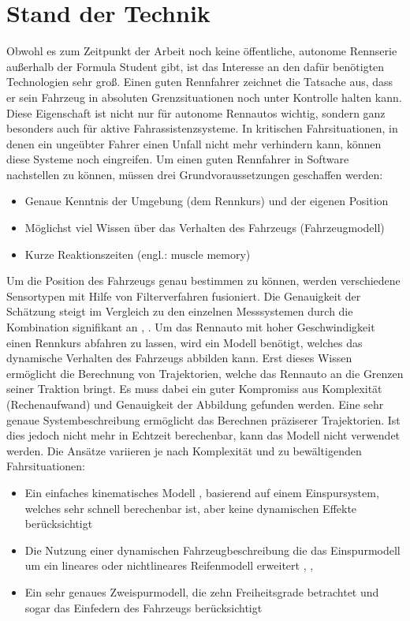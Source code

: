 \documentclass{like}
\begin{document}
\chapter{Stand der Technik}
Obwohl es zum Zeitpunkt der Arbeit noch keine öffentliche, autonome Rennserie außerhalb der Formula Student gibt, ist das Interesse an den dafür benötigten Technologien sehr groß.
Einen guten Rennfahrer zeichnet die Tatsache aus, dass er sein Fahrzeug in absoluten Grenzsituationen noch unter Kontrolle halten kann. Diese Eigenschaft ist nicht nur für autonome Rennautos wichtig, sondern ganz besonders auch für aktive Fahrassistenzsysteme. In kritischen Fahrsituationen, in denen ein ungeübter Fahrer einen Unfall nicht mehr verhindern kann, können diese Systeme noch eingreifen. Um einen guten Rennfahrer in Software nachstellen zu können, müssen drei Grundvoraussetzungen geschaffen werden:
\begin{itemize}
	\item Genaue Kenntnis der Umgebung (dem Rennkurs) und der eigenen Position
	\item Möglichst viel Wissen über das Verhalten des Fahrzeugs (Fahrzeugmodell)
	\item Kurze Reaktionszeiten (engl.: muscle memory)
\end{itemize}

Um die Position des Fahrzeugs genau bestimmen zu können, werden verschiedene Sensortypen mit Hilfe von Filterverfahren fusioniert. Die Genauigkeit der Schätzung steigt im Vergleich zu den einzelnen Messsystemen durch die Kombination signifikant an \cite{GPS_Fusion}, \cite{GPS_IMU_Fusion}.  
\newline
Um das Rennauto mit hoher Geschwindigkeit einen Rennkurs abfahren zu lassen, wird ein Modell benötigt, welches das dynamische Verhalten des Fahrzeugs abbilden kann. Erst dieses Wissen ermöglicht die Berechnung von Trajektorien, welche das Rennauto an die Grenzen seiner Traktion bringt. Es muss dabei ein guter Kompromiss aus Komplexität (Rechenaufwand) und Genauigkeit der Abbildung gefunden werden.
Eine sehr genaue Systembeschreibung ermöglicht das Berechnen präziserer Trajektorien. Ist dies jedoch nicht mehr in Echtzeit berechenbar, kann das Modell nicht verwendet werden.
Die Ansätze variieren je nach Komplexität und zu bewältigenden Fahrsituationen:
\begin{itemize}
	\item Ein einfaches kinematisches Modell \cite{MPC_Kinetic}, basierend auf einem Einspursystem, welches sehr schnell berechenbar ist, aber keine dynamischen Effekte berücksichtigt
	
	\item Die Nutzung einer dynamischen Fahrzeugbeschreibung die das Einspurmodell um ein lineares oder nichtlineares Reifenmodell erweitert \cite{rc_car_1_43}, \cite{MPC_Dynamic}, \cite{MPC_Dynamic_Tire_Model}
	
	\item Ein sehr genaues Zweispurmodell, die zehn Freiheitsgrade betrachtet und sogar das Einfedern des Fahrzeugs berücksichtigt \cite{doi:10.1137/S0036144502414942} 
\end{itemize}
\end{document}
